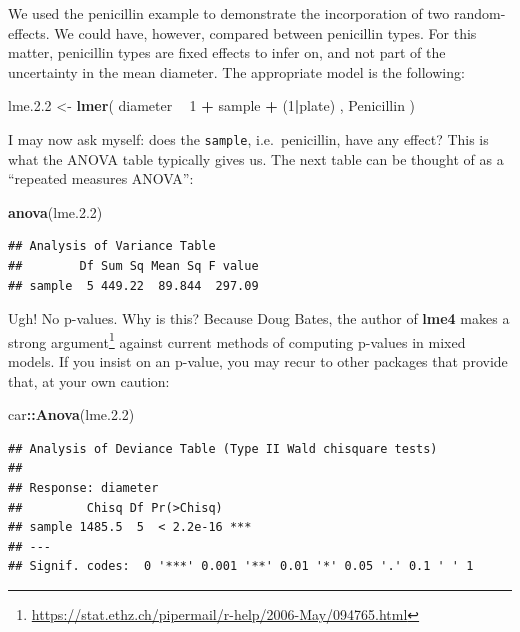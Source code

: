 \documentclass[]{book}
\newenvironment{Shaded}{\begin{snugshade}}{\end{snugshade}}
\newcommand{\DecValTok}[1]{\textcolor[rgb]{0.00,0.00,0.81}{#1}}
\newcommand{\FloatTok}[1]{\textcolor[rgb]{0.00,0.00,0.81}{#1}}
\newcommand{\KeywordTok}[1]{\textcolor[rgb]{0.13,0.29,0.53}{\textbf{#1}}}
\newcommand{\NormalTok}[1]{#1}
\newcommand{\OperatorTok}[1]{\textcolor[rgb]{0.81,0.36,0.00}{\textbf{#1}}}
\newcommand{\StringTok}[1]{\textcolor[rgb]{0.31,0.60,0.02}{#1}}
\renewcommand{\href}[2]{#2\footnote{\url{#1}}}
\theoremstyle{definition}
\theoremstyle{definition}
\theoremstyle{definition}
\theoremstyle{remark}
\begin{document}
We used the penicillin example to demonstrate the incorporation of two random-effects. We could have, however, compared between penicillin types. For this matter, penicillin types are fixed effects to infer on, and not part of the uncertainty in the mean diameter. The appropriate model is the following:

\begin{Shaded}
\begin{Highlighting}[]
\NormalTok{lme.}\FloatTok{2.2}\NormalTok{ <-}\StringTok{ }\KeywordTok{lmer}\NormalTok{( diameter }\OperatorTok{~}\StringTok{  }\DecValTok{1}  \OperatorTok{+}\StringTok{ }\NormalTok{sample }\OperatorTok{+}\StringTok{ }\NormalTok{(}\DecValTok{1}\OperatorTok{|}\NormalTok{plate) , Penicillin )}
\end{Highlighting}
\end{Shaded}

I may now ask myself: does the \texttt{sample}, i.e.~penicillin, have any effect? This is what the ANOVA table typically gives us. The next table can be thought of as a ``repeated measures ANOVA'':

\begin{Shaded}
\begin{Highlighting}[]
\KeywordTok{anova}\NormalTok{(lme.}\FloatTok{2.2}\NormalTok{)}
\end{Highlighting}
\end{Shaded}

\begin{verbatim}
## Analysis of Variance Table
##        Df Sum Sq Mean Sq F value
## sample  5 449.22  89.844  297.09
\end{verbatim}

Ugh! No p-values. Why is this? Because Doug Bates, the author of \textbf{lme4} makes a \href{https://stat.ethz.ch/pipermail/r-help/2006-May/094765.html}{strong argument} against current methods of computing p-values in mixed models. If you insist on an p-value, you may recur to other packages that provide that, at your own caution:

\begin{Shaded}
\begin{Highlighting}[]
\NormalTok{car}\OperatorTok{::}\KeywordTok{Anova}\NormalTok{(lme.}\FloatTok{2.2}\NormalTok{) }
\end{Highlighting}
\end{Shaded}

\begin{verbatim}
## Analysis of Deviance Table (Type II Wald chisquare tests)
## 
## Response: diameter
##         Chisq Df Pr(>Chisq)    
## sample 1485.5  5  < 2.2e-16 ***
## ---
## Signif. codes:  0 '***' 0.001 '**' 0.01 '*' 0.05 '.' 0.1 ' ' 1
\end{verbatim}
\end{document}
